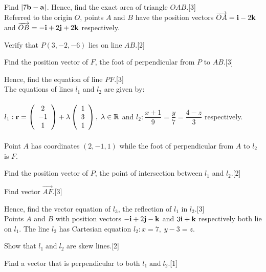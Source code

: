 \documentclass[12pt, a4 paper]{article}
\begin{document}
\begin{outline}[enumerate]
	\2 	Find $\left| {7{\bf{b}} - {\bf{a}}} \right|$. Hence, find the exact area of triangle $OAB$.\hfill[3]\\

	\1 Referred to the origin $O$, points $A$ and $B$ have the position vectors $\overrightarrow {OA}  = {\bf{i}} - 2{\bf{k}}$ and $\overrightarrow {OB}  =  - {\bf{i}} + 2{\bf{j}} + 2{\bf{k}}$ respectively.

	\2 Verify that $P(3,-2,-6)$ lies on line $AB$.\hfill[2]

	\2 Find the position vector of $F$, the foot of perpendicular from $P$ to $AB$.\hfill[3]

	\2 Hence, find the equation of line $PF$.\hfill[3]\\

	\1  The equations of lines ${l_1}$ and ${l_2}$ are given by:\\\\${l_1}:{\bf{r}} = \left( {\begin{array}{*{20}{c}}2\\{ - 1}\\1\end{array}} \right) + \lambda \left( {\begin{array}{*{20}{c}}1\\3\\1\end{array}} \right),\;\lambda  \in \mathbb{R}$ and ${l_2}:\dfrac{{x + 1}}{9} = \dfrac{y}{7} = \dfrac{{4 - z}}{3}$ respectively.\\\\Point $A$ has coordinates $(2, - 1,1)$ while the foot of perpendicular from $A$ to ${l_2}$ is $F$.

	\2 Find the position vector of $P$, the point of intersection between ${l_1}$ and ${l_2}$.\hfill[2]

	\2 Find vector $\overrightarrow {AF}$.\hfill[3]

	\2 Hence, find the vector equation of ${l_3}$, the reflection of ${l_1}$ in ${l_2}$.\hfill[3]\\

	\1 Points $A$ and $B$ with position vectors $ - {\bf{i}} + 2{\bf{j}} - {\bf{k}}$ and $3{\bf{i}} + {\bf{k}}$ respectively both lie on ${l_1}$. The line ${l_2}$ has Cartesian equation ${l_2}:x = 7,\;y - 3 = z$.

	\2 Show that ${l_1}\;{\textrm{and}}\;{l_2}$ are skew lines.\hfill[2]

	\2 Find a vector that is perpendicular to both ${l_1}\;{\textrm{and}}\;{l_2}$.\hfill[1]


\end{outline}
\end{document}
